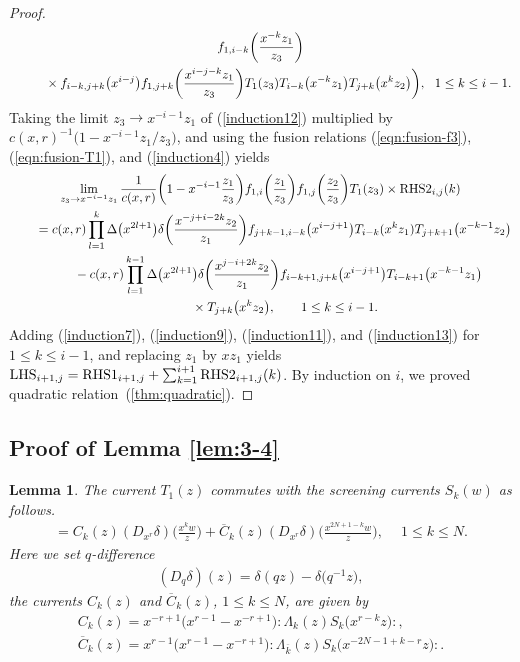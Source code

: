 \documentclass[10pt,a4paper]{amsart}
\numberwithin{equation}{section}
\newtheorem{Lemma}[Theorem]{Lemma}
\begin{document}
\begin{proof}
\begin{gather}
f_{1,i-k}\bigg(\frac{x^{-k}z_1}{z_3}\bigg)\notag
\\ \qquad \hphantom{=}
{}\times f_{i-k,j+k}\big(x^{i-j}\big)
f_{1,j+k}\bigg(\frac{x^{i-j-k}z_1}{z_3}\bigg)
T_1(z_3)T_{i-k}\big(x^{-k}z_1\big)T_{j+k}\big(x^kz_2\big)\bigg), \!\!\quad
1\leq k \leq i-1.\notag
\end{gather}
Taking the limit $z_3\to x^{-i-1}z_1$ of (\ref{induction12}) multiplied by $c(x,r)^{-1}\big(1-x^{-i-1}z_1/z_3\big)$, and using the fusion relations (\ref{eqn:fusion-f3}), (\ref{eqn:fusion-T1}), and (\ref{induction4}) yields
\begin{gather}
\lim_{z_3 \to x^{-i-1}z_1}\frac{1}{c(x,r)}\bigg(1-x^{-i-1}\frac{z_1}{z_3}\bigg)
f_{1,i}\bigg(\frac{z_1}{z_3}\bigg)
f_{1,j}\bigg(\frac{z_2}{z_3}\bigg)T_1(z_3)
\times {\rm RHS2}_{i, j}(k)\notag
\\ \qquad
{}=c(x,r)\prod_{l=1}^k \Delta\big(x^{2l+1}\big)
\delta\bigg(\frac{x^{-j+i-2k}z_2}{z_1}\bigg)
f_{j+k-1,i-k}\big(x^{i-j+1}\big)T_{i-k}(x^kz_1)T_{j+k+1}\big(x^{-k-1}z_2\big)\nonumber
\\ \qquad\hphantom{=}
{}-c(x,r)\prod_{l=1}^{k-1}\Delta\big(x^{2l+1}\big)
\delta\bigg(\frac{x^{j-i+2k}z_2}{z_1}\bigg)
f_{i-k+1,j+k}\big(x^{i-j+1}\big)T_{i-k+1}\big(x^{-k-1}z_1\big)\notag
\\ \qquad\hphantom{=+}
{}\times T_{j+k}\big(x^kz_2\big),\qquad 1\leq k \leq i-1.
\label{induction13}
\end{gather}
Adding (\ref{induction7}), (\ref{induction9}), (\ref{induction11}),
and (\ref{induction13}) for $1\leq k \leq i-1$, and replacing
$z_1$ by $xz_1$ yields ${\rm LHS}_{i+1,j}={\rm RHS1}_{i+1,j}+
\sum_{k=1}^{i+1}{\rm RHS2}_{i+1,j}(k)$.
By induction on $i$, we proved quadratic relation~(\ref{thm:quadratic}).
\end{proof}


\subsection{Proof of Lemma \ref{lem:3-4}}

\begin{Lemma}
\label{lemma:4-9}
The current $T_1(z)$ commutes with
the screening currents $S_k(w)$ as follows.
\begin{gather}
[T_1(z), S_k(w)]=C_k(z)
(D_{x^{r}}\delta)\bigg(\frac{x^{k}w}{z}\bigg)+\overline{C}_k(z)
(D_{x^{r}}\delta)\bigg(\frac{x^{2N+1-k}w}{z}\bigg),\quad\
1\leq k \leq N.
\label{eqn:commute-TS}
\end{gather}
Here we set $q$-difference
\begin{gather*}
(D_q\delta)(z)=\delta(qz)-\delta\big(q^{-1}z\big),
\end{gather*}
the currents $C_k(z)$ and $\overline{C}_k(z)$,
$1\leq k \leq N$, are given by
\begin{gather*}
C_k(z)=x^{-r+1}\big(x^{r-1}-x^{-r+1}\big){:}\Lambda_k(z)S_k\big(x^{r-k}z\big){:},
\\
\overline{C}_k(z)=x^{r-1}\big(x^{r-1}-x^{-r+1}\big)
{:}\Lambda_{\overline{k}}(z)S_k\big(x^{-2N{-}1+k-r}z\big){:}.
\end{gather*}
\end{Lemma}
\end{document}
